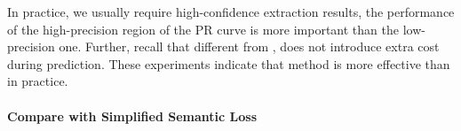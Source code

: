 


In practice, we usually require high-confidence extraction results, the performance of the high-precision region of the PR curve is more important than the low-precision one.
Further, recall that different from \ILP, \SL does not introduce extra cost during prediction.
These experiments indicate that \SL method is more effective than \ILP in practice.
\paragraph{Compare with Simplified Semantic Loss}


